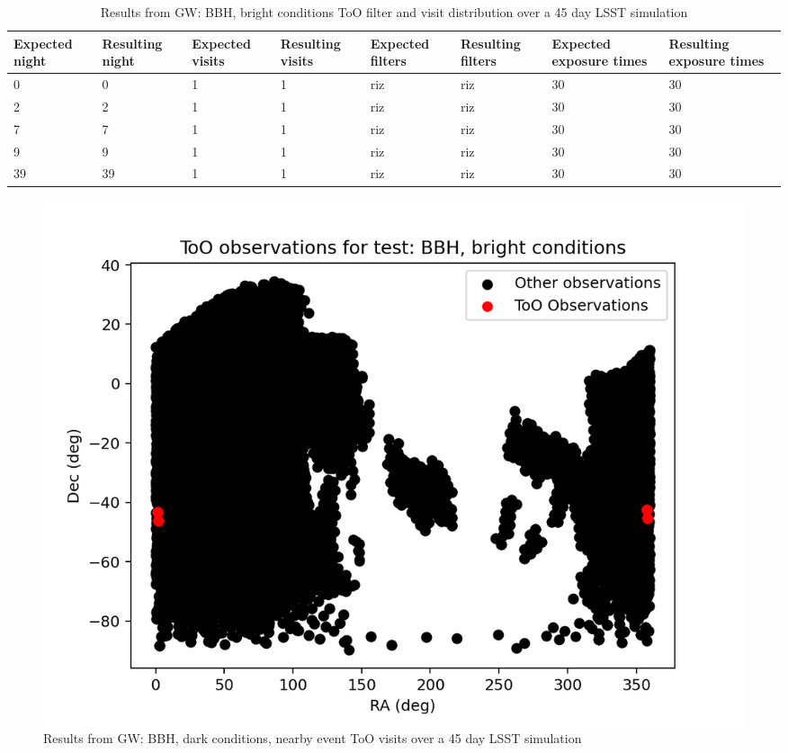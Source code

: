 \begin{table}[h!]
\centering
\begin{adjustbox}{max width=\textwidth}
\begin{tabular}{|l|l|l|l|l|l|l|l|}
\hline
Expected night & Resulting night & Expected visits & Resulting visits & Expected filters & Resulting filters & Expected exposure times & Resulting exposure times \\ \hline
0              & 0               & 1               & 1                & riz              & riz               & 30                      & 30                       \\ \hline
2              & 2               & 1               & 1                & riz              & riz               & 30                      & 30                       \\ \hline
7              & 7               & 1               & 1                & riz              & riz               & 30                      & 30                       \\ \hline
9              & 9               & 1               & 1                & riz              & riz               & 30                      & 30                       \\ \hline
39             & 39              & 1               & 1                & riz              & riz               & 30                      & 30                       \\ \hline
\end{tabular}
\end{adjustbox}
\caption{Results from GW: BBH, bright conditions ToO filter and visit distribution over a 45 day LSST simulation}
\label{tab:BBHBrightResults}
\end{table}


\begin{figure}[h!]
    \centering
    \includegraphics[width=0.85\linewidth]{figures/validationTests/SVRequired/BBHBrightPosition.png}
    \caption{Results from GW: BBH, dark conditions, nearby event ToO visits over a 45 day LSST simulation}
    \label{fig:GWBrightPositionResult}
\end{figure}

